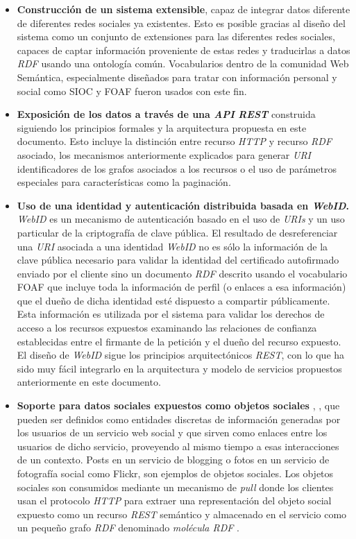 \begin{itemize}
\item \textbf{Construcci\'on de un sistema extensible}, capaz de integrar datos diferente de diferentes redes sociales ya existentes. Esto es posible gracias al dise\~no del sistema como un conjunto de extensiones para las diferentes redes sociales, capaces de captar informaci\'on proveniente de estas redes y traducirlas a datos \textit{RDF} usando una ontolog\'ia com\'un.  Vocabularios dentro de la comunidad Web Sem\'antica, especialmente dise\~nados para tratar con informaci\'on personal y social como SIOC \cite{sioc} y FOAF \cite{foaf} fueron usados con este fin.\\
\item \textbf{Exposici\'on de los datos a trav\'es de una \textit{API} \textit{REST}} construida siguiendo los principios formales y la arquitectura propuesta en este documento. Esto incluye la distinci\'on entre recurso \textit{HTTP} y recurso \textit{RDF} asociado, los mecanismos anteriormente explicados para generar \textit{URI} identificadores de los grafos asociados a los recursos o el uso de par\'ametros especiales para caracter\'isticas como la paginaci\'on.
\item \textbf{Uso de una identidad y autenticaci\'on distribuida basada en \textit{WebID}.} \textit{WebID} es un mecanismo de autenticaci\'on basado en el uso de \textit{URIs} y un uso particular de la criptograf\'ia de clave p\'ublica. El resultado de desreferenciar una \textit{URI} asociada a una identidad \textit{WebID} no es s\'olo la informaci\'on de la clave p\'ublica necesario para validar la identidad del certificado autofirmado enviado por el cliente sino un documento \textit{RDF} descrito usando el vocabulario FOAF que incluye toda la informaci\'on de perfil (o enlaces a esa informaci\'on) que el due\~no de dicha identidad est\'e dispuesto a compartir p\'ublicamente. Esta informaci\'on es utilizada por el sistema para validar los derechos de acceso a los recursos expuestos examinando las relaciones de confianza establecidas entre el firmante de la petici\'on y el due\~no del recurso expuesto. El dise\~no de \textit{WebID} sigue los principios arquitect\'onicos \textit{REST}, con lo que ha sido muy f\'acil integrarlo en la arquitectura y modelo de servicios propuestos anteriormente en este documento.
\item \textbf{Soporte para datos sociales expuestos como objetos sociales} \cite{engestrom2005some}, \cite{engestrom1995voice}, que pueden ser definidos como entidades discretas de informaci\'on generadas por los usuarios de un servicio web social y que sirven como enlaces entre los usuarios de dicho servicio, proveyendo al mismo tiempo a esas interacciones de un contexto. Posts en un servicio de blogging o fotos en un servicio de fotograf\'ia social como Flickr, son ejemplos de objetos sociales. Los objetos sociales son consumidos mediante un mecanismo de \textit{pull} donde los clientes usan el protocolo \textit{HTTP} para extraer una representaci\'on del objeto social expuesto como un recurso \textit{REST} sem\'antico \cite{kinsella2008navigating} y almacenado en el servicio como un peque\~no grafo \textit{RDF} denominado \textit{mol\'ecula RDF} \cite{ding2005tracking}. 

\end{itemize}
